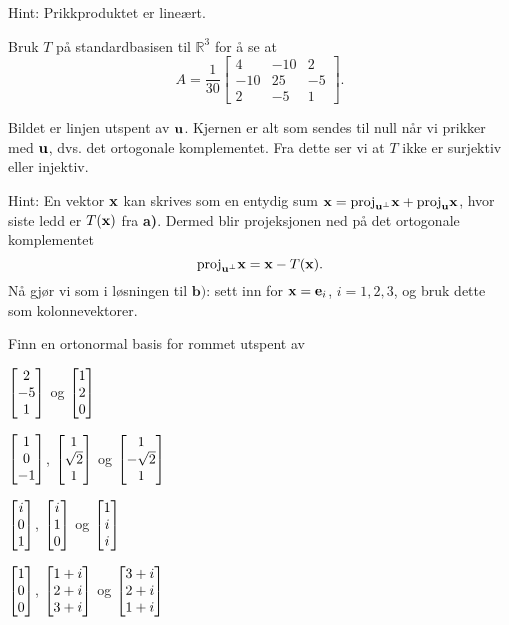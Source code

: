 \begin{losning}
\begin{punkt}
Hint: Prikkproduktet er lineært.
\end{punkt}

\begin{punkt}
Bruk $T$ på standardbasisen til $\mathbb{R}^3$ for å se at
$$A=\frac{1}{30}\begin{bmatrix}
4 & -10 & 2\\
-10 & 25 & -5\\
2 & -5 & 1
\end{bmatrix}.$$
\end{punkt}

\begin{punkt}
Bildet er linjen utspent av $\mathbf{u}$. Kjernen er alt som sendes til null når vi prikker med $\mathbf{u}$, dvs. det ortogonale komplementet. Fra dette ser vi at $T$ ikke er surjektiv eller injektiv.
\end{punkt}

\begin{punkt}
Hint: En vektor $\mathbf{x}$ kan skrives som en entydig sum $\mathbf{x}=\text{proj}_{\mathbf{u}^{\perp}}\mathbf{x}+\text{proj}_{\mathbf{u}}\mathbf{x}$, hvor siste ledd er $T(\mathbf{x})$ fra \textbf{a)}. Dermed blir projeksjonen ned på det ortogonale komplementet
$$\text{proj}_{\mathbf{u}^{\perp}}\mathbf{x}=\mathbf{x}-T(\mathbf{x}).$$ Nå gjør vi som i løsningen til $\textbf{b)}$: sett inn for $\mathbf{x}=\mathbf{e}_i$, $i=1,2,3$, og bruk dette som kolonnevektorer.
\end{punkt}
\end{losning}


\begin{oppgave}
Finn en ortonormal basis for rommet utspent av \\[2pt]

\begin{punkt}
$\begin{bmatrix} 2 \\ -5 \\ 1 \end{bmatrix}$ og $\begin{bmatrix} 1 \\ 2 \\ 0 \end{bmatrix}$ \\[4pt]
\end{punkt}

\begin{punkt}
$\begin{bmatrix} 1 \\ 0 \\ -1 \end{bmatrix}$, $\begin{bmatrix} 1 \\ \sqrt{2} \\ 1 \end{bmatrix}$ og $\begin{bmatrix} 1 \\ -\sqrt{2} \\ 1 \end{bmatrix}$\\[4pt]
\end{punkt}

\begin{punkt}
$\begin{bmatrix} i \\ 0 \\ 1 \end{bmatrix}$, $\begin{bmatrix} i \\ 1 \\ 0 \end{bmatrix}$ og $\begin{bmatrix} 1 \\ i \\ i \end{bmatrix}$\\[4pt]
\end{punkt}

\begin{punkt}
$\begin{bmatrix} 1 \\ 0 \\ 0 \end{bmatrix}$, $\begin{bmatrix} 1+i \\ 2+i \\ 3+i \end{bmatrix}$ og $\begin{bmatrix} 3+i \\ 2+i \\ 1+i \end{bmatrix}$\\[4pt]
\end{punkt}
\end{oppgave}

